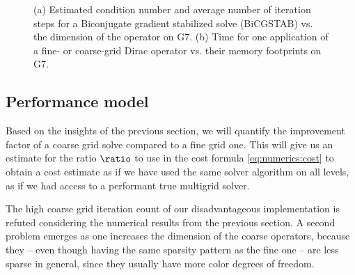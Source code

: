 
\begin{figure}
\centering

\hfill
{}

\caption{
(a) Estimated condition number and average number of iteration steps for a Biconjugate gradient stabilized solve (BiCGSTAB) vs. the dimension of the operator on G7. \takenfull
(b) Time for one application of a fine- or coarse-grid Dirac operator vs. their memory footprints on G7.
}
\label{fig:coarse}
\end{figure}

\subsection{Performance model}
\label{sec:numerics:performance:model}

Based on the insights of the previous section, we will quantify the improvement factor of a coarse grid solve compared to a fine grid one.
This will give us an estimate for the ratio $\ratio$ to use in the cost formula \cref{eq:numerics:cost} to obtain a cost estimate as if we have used the same solver algorithm on all levels, \ie as if we had access to a performant true multigrid solver.

The high coarse grid iteration count of our disadvantageous implementation is refuted considering the numerical results from the previous section.
A second problem emerges as one increases the dimension of the coarse operators, because they -- even though having the same sparsity pattern as the fine one -- are less sparse in general, since they usually have more color degrees of freedom.

